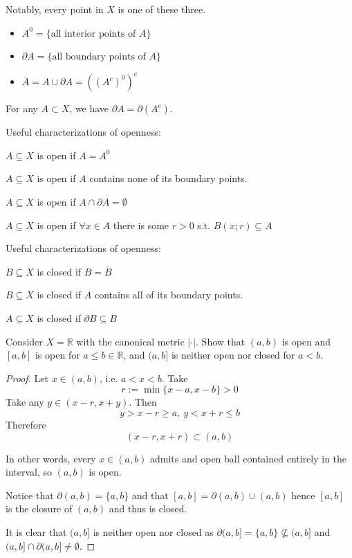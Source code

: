 Notably, every point in $X$ is one of these three. 

\begin{itemize}
    \item $A^0 = \{\text{all interior points of } A\}$
    \item $\partial A = \{\text{all boundary points of } A\}$ 
    \item $\overline A = A \cup \partial A = ((A^c)^0)^c$
\end{itemize}

\begin{prop}
    For any $A \subset X$, we have $\partial A = \partial (A^c)$.
\end{prop}

\begin{thm}
    Useful characterizations of openness: 

    $A \subseteq X$ is open if $A = A^0$

    $A \subseteq X$ is open if $A$ contains none of its boundary 
    points. 

    $A \subseteq X$ is open if $A \cap \partial A = \emptyset$

    $A \subseteq X$ is open if $\forall x \in A$ there is some 
    $r > 0$ s.t. $B(x;r) \subseteq A$ 
\end{thm}

\begin{thm}
    Useful characterizations of openness: 

    $B \subseteq X$ is closed if $B = \overline B$

    $B \subseteq X$ is closed if $A$ contains all of its boundary 
    points. 

    $A \subseteq X$ is closed if $ \partial B\subseteq B$
\end{thm}

\newpage 
\begin{prob}
    Consider $X = \mathbb R$ with the canonical metric $|\cdot|$. 
    Show that $(a,b)$ is open and $[a,b]$ is open for 
    $a \leq b \in \mathbb R$, and $(a,b]$ is 
    neither open nor closed for $a < b$.
\end{prob}
\begin{proof}
    Let $x \in (a,b)$, i.e. $a < x < b$. Take 
    \[
        r := \min\{x - a, x - b \} > 0
    \]
    Take any $y \in (x-r, x+y)$. 
    Then 
    \[
        y > x - r \geq a, \: y < x + r \leq b
    \]
    Therefore 
    \[
        (x-r, x + r) \subset (a,b)
    \]

    In other words, every $x \in (a,b)$ admits and open ball 
    contained entirely in the interval, so $(a,b)$ is open.

    Notice that $\partial(a,b) = \{a,b\}$ and that 
    $[a,b] = \partial(a,b) \cup (a,b)$ hence $[a,b]$ is the closure 
    of $(a,b)$ and thus is closed.  

    It is clear that $(a,b]$ is neither open nor closed as 
    $\partial(a,b] = \{a,b\} \not \subseteq (a,b]$ and 
    $(a,b] \cap \partial(a,b] \neq \emptyset$. 
\end{proof}

